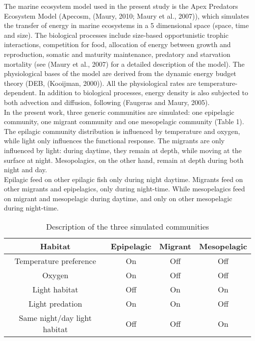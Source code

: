 The marine ecosystem model used in the present study is the Apex Predators Ecosystem Model (Apecosm, (Maury, 2010; Maury et al., 2007)), which simulates the transfer of energy in marine ecosystems in a 5 dimensional space (space, time and size). The biological processes include size-based opportunistic trophic interactions, competition for food, allocation of energy between growth and reproduction, somatic and maturity maintenance, predatory and starvation mortality (see (Maury et al., 2007) for a detailed description of the model). The physiological bases of the model are derived from the dynamic energy budget theory (DEB, (Kooijman, 2000)). All the physiological rates are temperature-dependent. In addition to biological processes, energy density is also subjected to both advection and diffusion, following (Faugeras and Maury, 2005).\\ 

In the present work, three generic communities are simulated: one epipelagic community, one migrant community and one mesopelagic community (Table 1). The epilagic community distribution is influenced by temperature and oxygen, while light only influences the functional response. The migrants are only influenced by light: during daytime, they remain at depth, while moving at the surface at night. Mesopolagics, on the other hand, remain at depth during both night and day.\\

Epilagic feed on other epilagic fish only during night daytime. Migrants feed on other migrants and epipelagics, only during night-time. While mesopelagics feed on migrant and mesopelagic during daytime, and only on other mesopelagic during night-time.\\

\begin{table}
\begin{tabular}{cccc}
     Habitat & Epipelagic & Migrant & Mesopelagic \\
     \hline
     \hline
      Temperature preference & On & Off & Off\\
      Oxygen & On & Off & Off \\
      Light habitat & Off & On & On \\
      Light predation & On & On & Off \\
      Same night/day light habitat  & Off & Off & On \\
\end{tabular}
\caption{Description of the three simulated communities}
\label{t:com-habitat}
\end{table}

